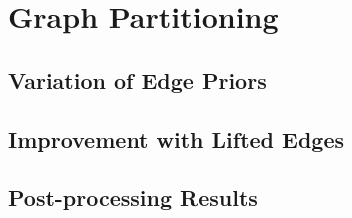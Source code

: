 \section{Graph Partitioning}

\subsection{Variation of Edge Priors}

\subsection{Improvement with Lifted Edges}

\subsection{Post-processing Results}